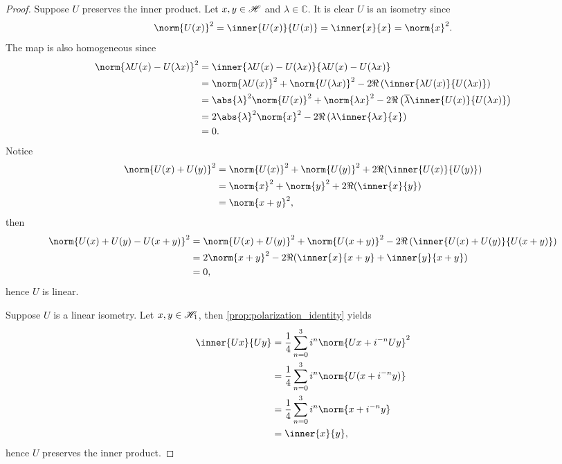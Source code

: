 \begin{proof}
    Suppose \(U\) preserves the inner product. Let \(x, y \in \mathscr{H}\) and \(\lambda \in \mathbb{C}\). It is clear \(U\) is an isometry since
    \begin{equation*}
        \norm{U(x)}^2 = \inner{U(x)}{U(x)} = \inner{x}{x} = \norm{x}^2.
    \end{equation*}
    The map is also homogeneous since
    \begin{align*}
        \norm{\lambda U(x) - U(\lambda x)}^2
        &= \inner{\lambda U(x) - U(\lambda x)}{\lambda U(x) - U(\lambda x)}\\
        &= \norm{\lambda U(x)}^2 + \norm{U(\lambda x)}^2 - 2\Re\left(\inner{\lambda U(x)}{U(\lambda x)}\right)\\
        &= \abs{\lambda}^2\norm{U(x)}^2 + \norm{\lambda x}^2 - 2\Re\left(\conj{\lambda} \inner{U(x)}{U(\lambda x)}\right)\\
        &= 2\abs{\lambda}^2 \norm{x}^2 - 2\Re\left(\lambda \inner{\lambda x}{x}\right)\\
        &= 0.
    \end{align*}
    Notice
    \begin{align*}
        \norm{U(x) + U(y)}^2 &= \norm{U(x)}^2 + \norm{U(y)}^2 + 2\Re(\inner{U(x)}{U(y)})\\
                             &= \norm{x}^2 + \norm{y}^2 + 2\Re(\inner{x}{y})\\
                             &= \norm{x + y}^2,
    \end{align*}
    then
    \begin{align*}
        \norm{U(x) + U(y) - U(x + y)}^2
        &= \norm{U(x) + U(y)}^2 + \norm{U(x+y)}^2 - 2\Re\left(\inner{U(x) + U(y)}{U(x + y)}\right)\\
        &=2\norm{x+y}^2 - 2\Re(\inner{x}{x+y} + \inner{y}{x+y})\\
        &= 0,
    \end{align*}
    hence \(U\) is linear.

    Suppose \(U\) is a linear isometry. Let \(x, y \in \mathscr{H}_1\), then \cref{prop:polarization_identity} yields
    \begin{align*}
        \inner{Ux}{Uy} &= \frac14 \sum_{n=0}^3 i^{n} \norm{Ux + i^{-n}Uy}^2\\
                                    &= \frac14 \sum_{n=0}^3 i^{n} \norm{U(x + i^{-n}y)}\\
                                    &= \frac14 \sum_{n=0}^3 i^{n} \norm{x + i^{-n}y}\\
                                    &= \inner{x}{y},
    \end{align*}
    hence \(U\) preserves the inner product.
\end{proof}
